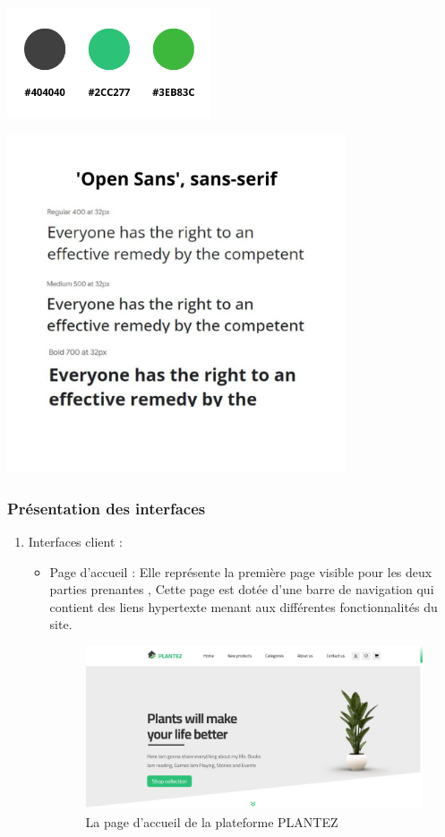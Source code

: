 \documentclass[a4paper,12pt,oneside]{article}
\begin{document}
{\newpage

\begin{minipage}{0.48\textwidth}
		\includegraphics[width=6cm]{colors}
\end{minipage}
\begin{minipage}{0.48\textwidth}
		\includegraphics[width=10cm]{fonts}
\end{minipage}



\subsubsection{Présentation des interfaces}
\begin{enumerate}
  	\item Interfaces client :
  	\begin{itemize}
  	\item Page d'accueil :
  	Elle représente la première page visible pour les deux parties prenantes , Cette page est
dotée d’une barre de navigation qui contient des liens hypertexte menant aux différentes
fonctionnalités du site.
		\begin{figure}[h]
		\centering
  		\includegraphics[width=15cm]{home}
  		\caption{La page d'accueil de la plateforme PLANTEZ}
		\end{figure}
		

\end{itemize}
\end{enumerate}}
\end{document}
